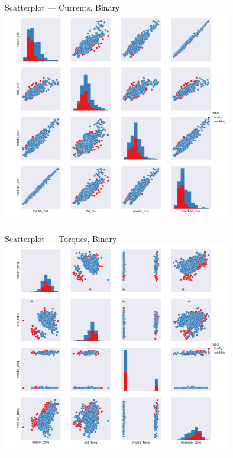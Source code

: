 \documentclass[9pt]{beamer}
\begin{document}
\begin{frame}{Scatterplot --- Currents, Binary}
\centering
\includegraphics[width=0.75\textwidth]{scattermatrix_currents_bin.pdf}
\end{frame}

\begin{frame}{Scatterplot --- Torques, Binary}
\centering
\includegraphics[width=0.75\textwidth]{scattermatrix_torques_bin.pdf}
\end{frame}
\end{document}
